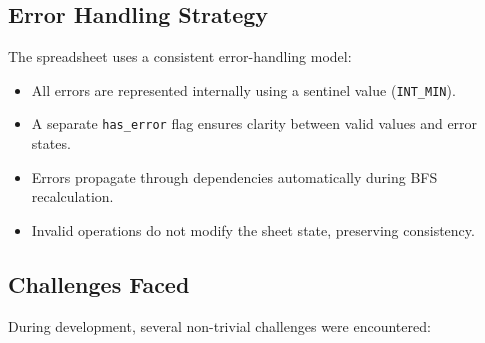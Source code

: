 \documentclass[11pt,a4paper]{article}
\begin{document}
\subsection{Error Handling Strategy}

The spreadsheet uses a consistent error-handling model:

\begin{itemize}
    \item All errors are represented internally using a sentinel value (\texttt{INT\_MIN}).
    \item A separate \texttt{has\_error} flag ensures clarity between valid values and error states.
    \item Errors propagate through dependencies automatically during BFS recalculation.
    \item Invalid operations do not modify the sheet state, preserving consistency.
\end{itemize}

\subsection{Challenges Faced}

During development, several non-trivial challenges were encountered:
\end{document}
